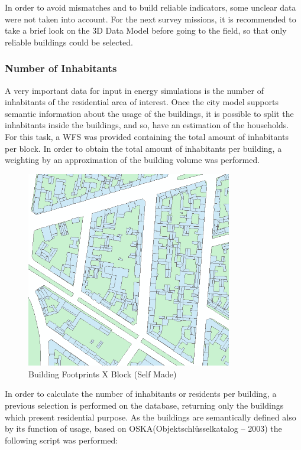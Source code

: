 In order to avoid mismatches and to build reliable indicators, some unclear data were not taken into account. For the next survey missions, it is recommended to take a brief look on the 3D Data Model before going to the field, so that only reliable buildings could be selected.



\subsubsection{Number of Inhabitants}

A very important data for input in energy simulations is the number of inhabitants of the residential area of interest. Once the city model supports semantic information about the usage of the buildings, it is possible to split the inhabitants inside the buildings, and so, have an estimation of the households.\\
For this task, a WFS was provided containing the total amount of inhabitants per block. In order to obtain the total amount of inhabitants per building, a weighting by an approximation of the building volume was performed.

\begin{figure}[ht]
	\centering
	\includegraphics[width=0.8\textwidth]{phase1/group3/fig3.PNG}
	\caption{Building Footprints X Block (Self Made)}
	\label{fig:figure3}
\end{figure}

In order to calculate the number of inhabitants or residents per building, a previous selection is performed on the database, returning only the buildings which present residential purpose. As the buildings are semantically defined also by its function of usage, based on OSKA(Objektschlüsselkatalog – 2003) the following script was performed: \\

